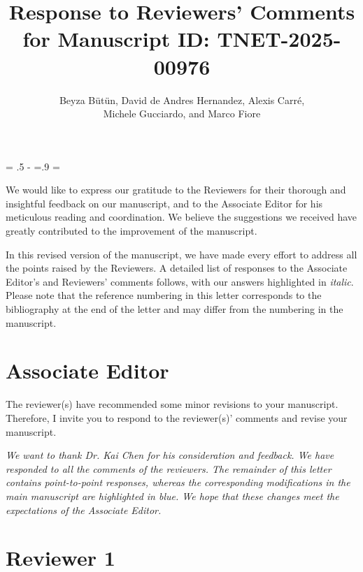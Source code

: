 \documentclass[10pt,compsoc,onecolumn,a4paper]{IEEEtran}
\title{{\LARGE Response to Reviewers' Comments for Manuscript ID:   TNET-2025-00976}}
\author{
	Beyza B\"{u}t\"{u}n,
    David de Andres Hernandez,
    Alexis Carré, \\
	Michele Gucciardo, and
	Marco Fiore%
}
\newcommand{\ls}[1]
  {\dimen0=\fontdimen6\the\font
   \lineskip=#1\dimen0
   \advance\lineskip.5\fontdimen5\the\font
   \advance\lineskip-\dimen0
   \lineskiplimit=.9\lineskip
   \baselineskip=\lineskip
   \advance\baselineskip\dimen0
   \normallineskip\lineskip
   \normallineskiplimit\lineskiplimit
   \normalbaselineskip\baselineskip
   \ignorespaces
}
\begin{document}
\renewcommand{\baselinestretch}{0.7} 
\maketitle

\ls{1.4}


We would like to express our gratitude to the Reviewers for their thorough and insightful feedback on our manuscript, and to the Associate Editor for his meticulous reading and coordination. We believe the suggestions we received have greatly contributed to the improvement of the manuscript.

In this revised version of the manuscript, we have made every effort to address all the points raised by the Reviewers. A detailed list of responses to the Associate Editor's and Reviewers' comments follows, with our answers highlighted in {\it italic}. Please note that the reference numbering in this letter corresponds to the bibliography at the end of the letter and may differ from the numbering in the manuscript. 


\section*{Associate Editor}

The reviewer(s) have recommended some minor revisions to your manuscript. Therefore, I invite you to respond to the reviewer(s)' comments and revise your manuscript.

{\it 
We want to thank Dr. Kai Chen for his consideration and feedback. We have responded to all the comments of the reviewers. The remainder of this letter contains point-to-point responses, whereas the corresponding modifications in the main manuscript are highlighted in {\color{blue} blue}.
We hope that these changes meet the expectations of the Associate Editor.}



\section*{Reviewer 1}
\end{document}
